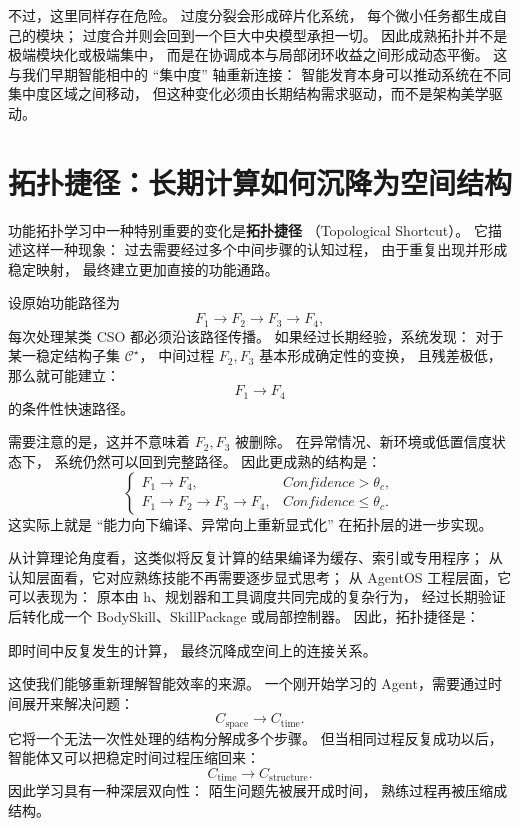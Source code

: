 不过，这里同样存在危险。
过度分裂会形成碎片化系统，
每个微小任务都生成自己的模块；
过度合并则会回到一个巨大中央模型承担一切。
因此成熟拓扑并不是极端模块化或极端集中，
而是在协调成本与局部闭环收益之间形成动态平衡。
这与我们早期智能相中的 ``集中度'' 轴重新连接：
智能发育本身可以推动系统在不同集中度区域之间移动，
但这种变化必须由长期结构需求驱动，而不是架构美学驱动。

\section{拓扑捷径：长期计算如何沉降为空间结构}

功能拓扑学习中一种特别重要的变化是\textbf{拓扑捷径}
（Topological Shortcut）。
它描述这样一种现象：
过去需要经过多个中间步骤的认知过程，
由于重复出现并形成稳定映射，
最终建立更加直接的功能通路。

设原始功能路径为
\[
F_1
\rightarrow
F_2
\rightarrow
F_3
\rightarrow
F_4,
\]
每次处理某类 CSO 都必须沿该路径传播。
如果经过长期经验，系统发现：
对于某一稳定结构子集 $\mathcal C^\star$，
中间过程 $F_2,F_3$ 基本形成确定性的变换，
且残差极低，那么就可能建立：
\[
F_1
\rightarrow
F_4
\]
的条件性快速路径。

需要注意的是，这并不意味着 $F_2,F_3$ 被删除。
在异常情况、新环境或低置信度状态下，
系统仍然可以回到完整路径。
因此更成熟的结构是：
\[
\begin{cases}
F_1\rightarrow F_4,
&
Confidence>\theta_c,
\\
F_1\rightarrow F_2\rightarrow F_3\rightarrow F_4,
&
Confidence\leq\theta_c.
\end{cases}
\]
这实际上就是 ``能力向下编译、异常向上重新显式化''
在拓扑层的进一步实现。

从计算理论角度看，这类似将反复计算的结果编译为缓存、索引或专用程序；
从认知层面看，它对应熟练技能不再需要逐步显式思考；
从 AgentOS 工程层面，它可以表现为：
原本由 h、规划器和工具调度共同完成的复杂行为，
经过长期验证后转化成一个 BodySkill、SkillPackage 或局部控制器。
因此，拓扑捷径是：
\begin{statementbox}
\centering
{}
\end{statementbox}
即时间中反复发生的计算，
最终沉降成空间上的连接关系。

这使我们能够重新理解智能效率的来源。
一个刚开始学习的 Agent，需要通过时间展开来解决问题：
\[
C_{\mathrm{space}}
\rightarrow
C_{\mathrm{time}}.
\]
它将一个无法一次性处理的结构分解成多个步骤。
但当相同过程反复成功以后，
智能体又可以把稳定时间过程压缩回来：
\[
C_{\mathrm{time}}
\rightarrow
C_{\mathrm{structure}}.
\]
因此学习具有一种深层双向性：
陌生问题先被展开成时间，
熟练过程再被压缩成结构。

